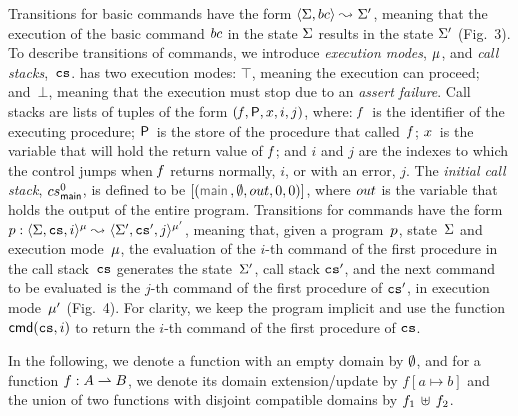 \noindent Transitions for basic commands have the form 
{\small $\langle \Sigma, bc \rangle \leadsto_{} \Sigma'$}, meaning that the execution of the basic command 
$bc$ in the state $\Sigma$ results in the state $\Sigma'$ (Fig.~3). 
%
To describe transitions of commands, we introduce \emph{execution modes}, $\mu$, and 
\emph{call stacks},~$\mathtt{cs}$.  \jsil has two execution modes: 
$\top$, meaning the execution can proceed; and~$\bot$, meaning that the execution must stop due to an \emph{assert failure}. Call stacks are lists of tuples of the form $(\mathit{f}, {\sf P}, x, i, j)$, where: 
$\mathit{f}$~is the identifier of the executing procedure;
${\sf P}$~is the store of the procedure that called~$\mathit{f}$; 
$x$~is the variable that will hold the return value of $\mathit{f}$; %
and $i$ and $j$ are the indexes to which the control jumps when $\mathit{f}$ returns normally, $i$, or with an error, $j$. 
The \emph{initial call stack}, $cs_{\sf main}^0$, is defined to be {\small $[ (\jsilmain, \storeemp, \jsilout, 0, 0) ]$}, where $out$ is the variable that holds the output of the entire program.  
Transitions for  commands have the form  {\small $p: \langle \Sigma, \mathtt{cs}, i \rangle^{\mu} \leadsto_{} \langle \Sigma', \mathtt{cs}', j \rangle^{\mu'}$}, 
meaning that, given a program~$p$, state~$\Sigma$ and execution mode~$\mu$, the evaluation of the $i$-th command of the first procedure in the 
call stack~$\mathtt{cs}$ generates 
the state~$\Sigma'$, call stack $\mathtt{cs}'$,  and the next command to be evaluated is the $j$-th command of the first procedure 
of $\mathtt{cs}'$, in execution mode~$\mu'$ (Fig.~4). 
For clarity, we keep the program implicit and use the function {\small $\ccmd{\abscs, i}$} to return the $i$-th command of the first procedure of $\mathtt{cs}$.

 In the following, we denote a function with an empty domain by $\emptyset$, and for a function $f : A \rightharpoonup B$, we denote its domain extension/update by $f[a \mapsto b]$ %
and the union of two functions with disjoint compatible domains by $f_1 \, \uplus \, f_2$. 

